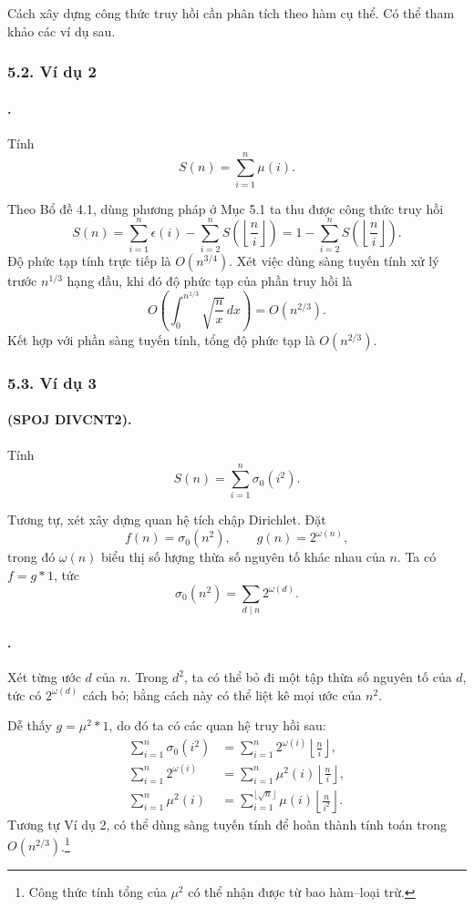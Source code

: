 \documentclass[11pt]{article}
\begin{document}
Cách xây dựng công thức truy hồi cần phân tích theo hàm cụ thể. Có thể tham
khảo các ví dụ sau.

\subsubsection*{5.2. Ví dụ 2}

\paragraph{.}
Tính
\[
  S(n)=\sum_{i=1}^{n}\mu(i).
\]

Theo Bổ đề 4.1, dùng phương pháp ở Mục 5.1 ta thu được công thức truy hồi
\[
  S(n)=\sum_{i=1}^{n}\epsilon(i)
  -\sum_{i=2}^{n}S\left(\left\lfloor\frac{n}{i}\right\rfloor\right)
  =
  1-\sum_{i=2}^{n}S\left(\left\lfloor\frac{n}{i}\right\rfloor\right).
\]
Độ phức tạp tính trực tiếp là \(O(n^{3/4})\). Xét việc dùng sàng tuyến tính xử
lý trước \(n^{1/3}\) hạng đầu, khi đó độ phức tạp của phần truy hồi là
\[
  O\left(\int_0^{n^{1/3}}\sqrt{\frac{n}{x}}\,dx\right)=O(n^{2/3}).
\]
Kết hợp với phần sàng tuyến tính, tổng độ phức tạp là \(O(n^{2/3})\).

\subsubsection*{5.3. Ví dụ 3}

\paragraph{ (SPOJ DIVCNT2).}
Tính
\[
  S(n)=\sum_{i=1}^{n}\sigma_0(i^2).
\]

Tương tự, xét xây dựng quan hệ tích chập Dirichlet. Đặt
\[
  f(n)=\sigma_0(n^2),\qquad g(n)=2^{\omega(n)},
\]
trong đó \(\omega(n)\) biểu thị số lượng thừa số nguyên tố khác nhau của
\(n\). Ta có \(f=g*1\), tức
\[
  \sigma_0(n^2)=\sum_{d\mid n}2^{\omega(d)}.
\]

\paragraph{.}
Xét từng ước \(d\) của \(n\). Trong \(d^2\), ta có thể bỏ đi một tập thừa số
nguyên tố của \(d\), tức có \(2^{\omega(d)}\) cách bỏ; bằng cách này có thể
liệt kê mọi ước của \(n^2\).

Dễ thấy \(g=\mu^2*1\), do đó ta có các quan hệ truy hồi sau:
\[
\begin{aligned}
  \sum_{i=1}^{n}\sigma_0(i^2)
  &= \sum_{i=1}^{n}2^{\omega(i)}
     \left\lfloor\frac{n}{i}\right\rfloor,\\
  \sum_{i=1}^{n}2^{\omega(i)}
  &= \sum_{i=1}^{n}\mu^2(i)
     \left\lfloor\frac{n}{i}\right\rfloor,\\
  \sum_{i=1}^{n}\mu^2(i)
  &= \sum_{i=1}^{\lfloor\sqrt n\rfloor}\mu(i)
     \left\lfloor\frac{n}{i^2}\right\rfloor.
\end{aligned}
\]
Tương tự Ví dụ 2, có thể dùng sàng tuyến tính để hoàn thành tính toán trong
\(O(n^{2/3})\).\footnote{Công thức tính tổng của \(\mu^2\) có thể nhận được
từ bao hàm--loại trừ.}
\end{document}
